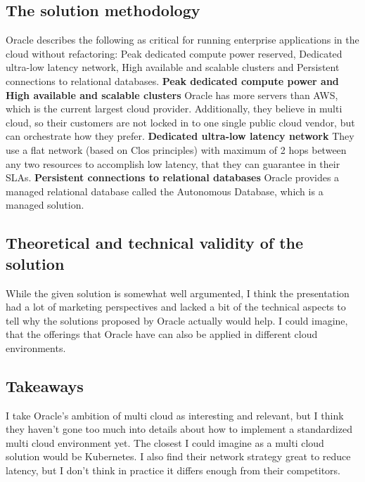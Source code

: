 \documentclass[11pt]{article}
\begin{document}
\subsection*{The solution methodology}
Oracle describes the following as critical for running enterprise applications in the cloud without refactoring: Peak dedicated compute power reserved, Dedicated ultra-low latency network, High available and scalable clusters and Persistent connections to relational databases.\newline
\newline
\textbf{Peak dedicated compute power and High available and scalable clusters}  Oracle has more servers than AWS, which is the current largest cloud provider. Additionally, they believe in multi cloud, so their customers are not locked in to one single public cloud vendor, but can orchestrate how they prefer.\newline
\newline
\textbf{Dedicated ultra-low latency network}  They use a flat network (based on Clos principles) with maximum of 2 hops between any two resources to accomplish low latency, that they can guarantee in their SLAs.\newline
\newline
\textbf{Persistent connections to relational databases}  Oracle provides a managed relational database called the Autonomous Database, which is a managed solution.

\subsection*{Theoretical and technical validity of the solution}
While the given solution is somewhat well argumented, I think the presentation had a lot of marketing perspectives and lacked a bit of the technical aspects to tell why the solutions proposed by Oracle actually would help. I could imagine, that the offerings that Oracle have can also be applied in different cloud environments.

\subsection*{Takeaways}
I take Oracle’s ambition of multi cloud as interesting and relevant, but I think they haven’t gone too much into details about how to implement a standardized multi cloud environment yet. The closest I could imagine as a multi cloud solution would be Kubernetes.
I also find their network strategy great to reduce latency, but I don’t think in practice it differs enough from their competitors.
\end{document}

